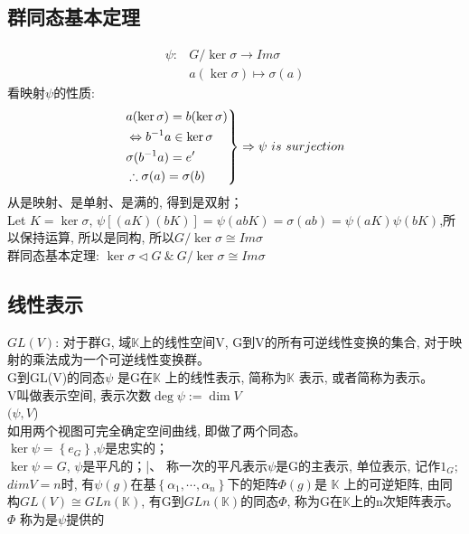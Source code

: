 \documentclass[UTF8]{../09-Mathematics}
\begin{document}
\subsection{群同态基本定理}
\begin{equation}
\begin{split}
\psi : &G/ \ker \sigma \to Im \sigma\\
& a (\ker \sigma) \mapsto \sigma(a)
\end{split}
\end{equation}
看映射$\psi$的性质: 
\begin{equation}
\label{证明同构1}
\left.
\begin{aligned}
& a(\ker \sigma)=b(\ker \sigma)\\
& \Leftrightarrow b^{-1}a \in \ker \sigma\\
&\sigma(b^{-1}a)=e'\\
&\therefore \sigma(a)=\sigma(b)
\end{aligned}
\right\} \Rightarrow \psi \ is \ surjection\\
\end{equation}
从是映射、是单射、是满的, 得到是双射；\\
Let $K=\ker \sigma$, $\psi [(aK)(bK)]=\psi (abK)=\sigma(ab)=\psi(aK)\psi(bK)$,所以保持运算, 所以是同构, 所以$G/ \ker \sigma \cong Im \sigma$\\
群同态基本定理: $\ker \sigma \lhd G \ \& \   G/ \ker \sigma \cong Im \sigma  $ 



\subsection{线性表示}
$GL(V)$: 对于群G, 域$\mathbb K$上的线性空间V, G到V的所有可逆线性变换的集合, 对于映射的乘法成为一个可逆线性变换群。\\
G到GL(V)的同态$\psi $ 是G在$\mathbb K$ 上的线性表示, 简称为$\mathbb K$ 表示, 或者简称为表示。\\
V叫做表示空间, 表示次数$\deg \psi := \dim V$\\
$(\psi ,V$)\\
如用两个视图可完全确定空间曲线, 即做了两个同态。\\
$\ker \psi =\left\{ e_G \right\}$,$\psi $是忠实的；\\
$\ker \psi =G$, $\psi$是平凡的；|、
称一次的平凡表示$\psi $是G的主表示, 单位表示, 记作$1_G$;\\
$dimV=n$时, 有$\psi (g)$在基$\left\{ \alpha_1,\cdots , \alpha_n \right\}$下的矩阵$\Phi(g)$是 $\mathbb K$ 上的可逆矩阵, 由同构$GL(V) \cong GLn(\mathbb K)$, 有G到$GLn(\mathbb K)$的同态$\Phi$, 称为G在$\mathbb K$上的n次矩阵表示。\\
$\Phi $ 称为是$\psi $提供的
\end{document}
